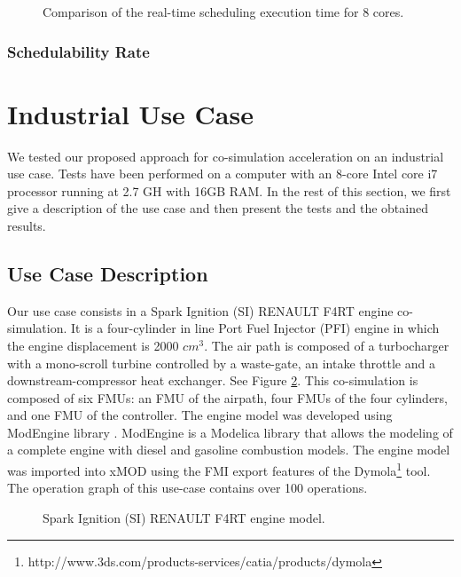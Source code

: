 \begin{figure}[phbt]
\centering

\caption{Comparison of the real-time scheduling execution time for $8$ cores.}
\label{fig:RT_sched_exec_8}
\end{figure}

\subsubsection{Schedulability Rate}

\section{Industrial Use Case} 

We tested our proposed approach for co-simulation acceleration on an industrial use case. Tests have been performed on a computer with an 8-core Intel core i7 processor running at 2.7 GH with 16GB RAM. In the rest of this section, we first give a description of the use case and then present the tests and the obtained results.

\subsection{Use Case Description}

Our use case consists in a Spark Ignition (SI) RENAULT F4RT engine co-simulation. It is a four-cylinder in line Port Fuel Injector (PFI) engine in which the engine displacement is 2000 $cm^3$. The air path is composed of a turbocharger with a mono-scroll turbine controlled by a waste-gate, an intake throttle and a downstream-compressor heat exchanger. See Figure \ref{fig:use_case}. This co-simulation is composed of six FMUs: an FMU of the airpath, four FMUs of the four cylinders, and one FMU of the controller.
The engine model was developed using ModEngine library \cite{benjelloun:2011}. ModEngine is a Modelica library that allows the modeling of a complete engine with diesel and gasoline combustion models. The engine model was imported into xMOD using the FMI export features of the Dymola\footnote{http://www.3ds.com/products-services/catia/products/dymola} tool. The operation graph of this use-case contains over 100 operations.

\begin{figure}[phbt]
\centering

\caption{Spark Ignition (SI) RENAULT F4RT engine model.}
\label{fig:use_case}
\end{figure}


